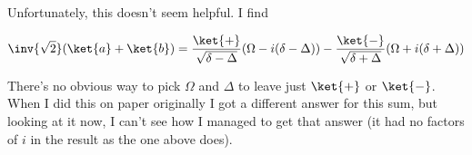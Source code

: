 Unfortunately, this doesn't seem helpful.  I find

\begin{equation}\label{eqn:qmIexamPractice2008Dec:2:170}
\inv{\sqrt{2}} ( \ket{a} + \ket{b} ) = 
\frac{\ket{+}}{\sqrt{\delta - \Delta}}( \Omega - i (\delta - \Delta) )
-\frac{\ket{-}}{\sqrt{\delta + \Delta}}( \Omega + i (\delta + \Delta) )
\end{equation}

There's no obvious way to pick $\Omega$ and $\Delta$ to leave just $\ket{+}$ or $\ket{-}$.  When I did this on paper originally I got a different answer for this sum, but looking at it now, I can't see how I managed to get that answer (it had no factors of $i$ in the result as the one above does).

\EndNoBibArticle

